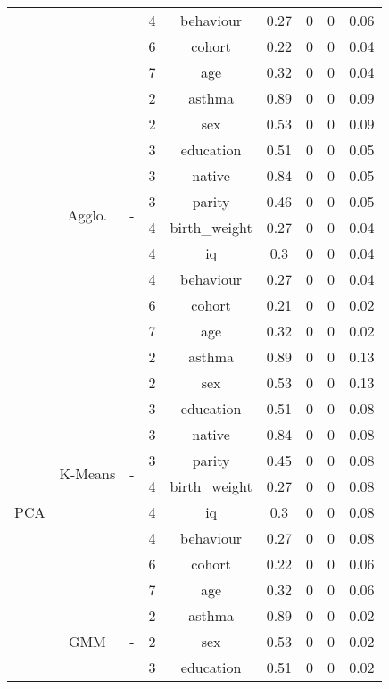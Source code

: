 \documentclass[CAT,BIB]{TFUOC}%
\begin{document}
\begin{table}
\begin{tabular}{@{}ccccccccc@{}}
            &  &  & 4 & behaviour & 0.27 & 0 & 0 & 0.06 \\
            &  &  & 6 & cohort & 0.22 & 0 & 0 & 0.04 \\
            &  &  & 7 & age & 0.32 & 0 & 0 & 0.04 \\ \cmidrule(l){2-9}
            & \multirow{10}{*}{Agglo.} & \multirow{10}{*}{-} & 2 & asthma & 0.89 & 0 & 0 & 0.09 \\
            &  &  & 2 & sex & 0.53 & 0 & 0 & 0.09 \\
            &  &  & 3 & education & 0.51 & 0 & 0 & 0.05 \\
            &  &  & 3 & native & 0.84 & 0 & 0 & 0.05 \\
            &  &  & 3 & parity & 0.46 & 0 & 0 & 0.05 \\
            &  &  & 4 & birth\_weight & 0.27 & 0 & 0 & 0.04 \\
            &  &  & 4 & iq & 0.3 & 0 & 0 & 0.04 \\
            &  &  & 4 & behaviour & 0.27 & 0 & 0 & 0.04 \\
            &  &  & 6 & cohort & 0.21 & 0 & 0 & 0.02 \\
            &  &  & 7 & age & 0.32 & 0 & 0 & 0.02 \\ \midrule
            \multirow{30}{*}{PCA} & \multirow{10}{*}{K-Means} & \multirow{10}{*}{-} & 2 & asthma & 0.89 & 0 & 0 & 0.13 \\
            &  &  & 2 & sex & 0.53 & 0 & 0 & 0.13 \\
            &  &  & 3 & education & 0.51 & 0 & 0 & 0.08 \\
            &  &  & 3 & native & 0.84 & 0 & 0 & 0.08 \\
            &  &  & 3 & parity & 0.45 & 0 & 0 & 0.08 \\
            &  &  & 4 & birth\_weight & 0.27 & 0 & 0 & 0.08 \\
            &  &  & 4 & iq & 0.3 & 0 & 0 & 0.08 \\
            &  &  & 4 & behaviour & 0.27 & 0 & 0 & 0.08 \\
            &  &  & 6 & cohort & 0.22 & 0 & 0 & 0.06 \\
            &  &  & 7 & age & 0.32 & 0 & 0 & 0.06 \\ \cmidrule(l){2-9}
            & \multirow{10}{*}{GMM} & \multirow{10}{*}{-} & 2 & asthma & 0.89 & 0 & 0 & 0.02 \\
            &  &  & 2 & sex & 0.53 & 0 & 0 & 0.02 \\
            &  &  & 3 & education & 0.51 & 0 & 0 & 0.02 \\

\end{tabular}
\end{table}
\end{document}
